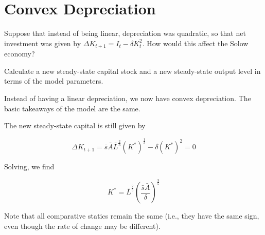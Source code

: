 \documentclass{article}
\begin{document}
\color{black}

\section{Convex Depreciation}

Suppose that instead of being linear, depreciation was quadratic, so that net investment was given by $\Delta K_{t+1} = I_t - \delta K_t^2$. How would this affect the Solow economy?

Calculate a new steady-state capital stock and a new steady-state output level in terms of the model parameters.

\color{red}

Instead of having a linear depreciation, we now have convex depreciation. The basic takeaways of the model are the same.

The new steady-state capital is still given by

\[
\Delta K_{t+1} = \bar{s}\bar{A} \bar{L}^{\frac23} (K^{*})^{\frac13} - \delta (K^{*}) ^2 = 0 
\]

Solving, we find

\[
K^{*} = \bar{L}^{\frac25} \left( \frac{\bar{s} \bar{A}}{\delta} \right) ^ {\frac35}
\]

Note that all comparative statics remain the same (i.e., they have the same sign, even though the rate of change may be different).
\end{document}
